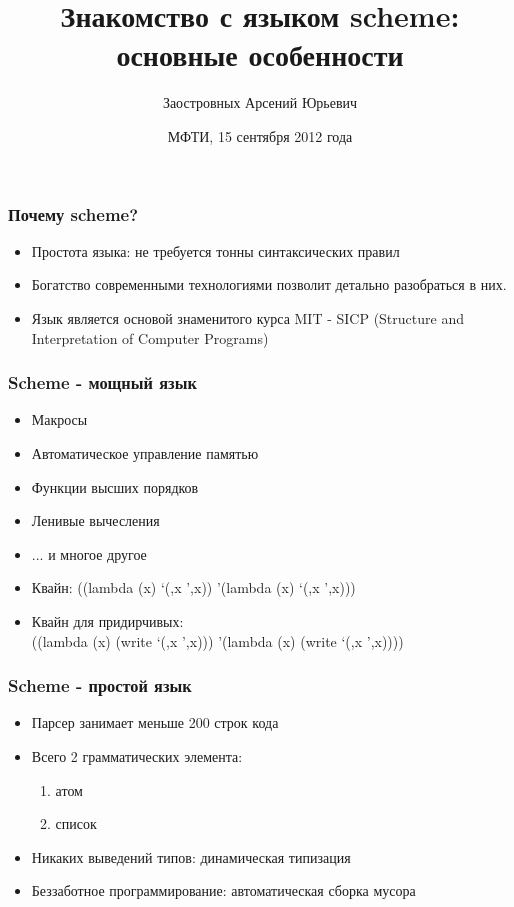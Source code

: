\documentclass[16pt,pdf,unicode]{beamer}
\title[Знакомство со Scheme]{Знакомство с языком scheme: основные особенности}
\author[А.Ю. Заостровных]{Заостровных Арсений Юрьевич}
\institute[МФТИ]{Московский физико-технический университет\\
	{\tiny государственный университет}\\}
\date[2012]{МФТИ, 15 сентября 2012 года}
\begin{document}

\begin{frame}[plain]
\maketitle
\end{frame}

\begin{frame}
\frametitle{Почему scheme?}
\begin{itemize}
\item Простота языка: не требуется тонны синтаксических правил
\item Богатство современными технологиями позволит детально разобраться в них.
\item Язык является основой знаменитого курса MIT - SICP (Structure and Interpretation of Computer Programs)
\end{itemize}
\end{frame}

\begin{frame}
\frametitle{Scheme - мощный язык}
\begin{itemize}
\item Макросы
\item Автоматическое управление памятью
\item Функции высших порядков
\item Ленивые вычесления
\item ... и многое другое
\vspace{15 mm}
\item Квайн: ((lambda (x) `(,x ',x)) '(lambda (x) `(,x ',x)))
\item<2> Квайн для придирчивых:\\
  ((lambda (x) (write `(,x ',x))) '(lambda (x) (write `(,x ',x))))
\end{itemize}
\end{frame}

\begin{frame}
\frametitle{Scheme - простой язык}
\begin{itemize}
\item Парсер занимает меньше 200 строк кода
\item Всего 2 грамматических элемента:
  \begin{enumerate}
    \item атом
    \item список
  \end{enumerate}
\item Никаких выведений типов: динамическая типизация
\item Беззаботное программирование: автоматическая сборка мусора
\end{itemize}
\end{frame}
\end{document}
